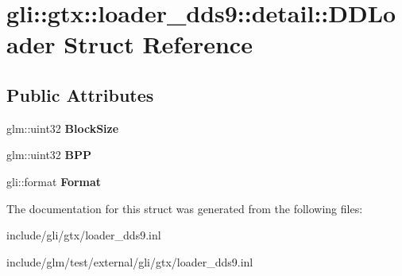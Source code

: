 \hypertarget{structgli_1_1gtx_1_1loader__dds9_1_1detail_1_1DDLoader}{\section{gli\-:\-:gtx\-:\-:loader\-\_\-dds9\-:\-:detail\-:\-:\-D\-D\-Loader \-Struct \-Reference}
\label{structgli_1_1gtx_1_1loader__dds9_1_1detail_1_1DDLoader}
}
\subsection*{\-Public \-Attributes}
\begin{DoxyCompactItemize}
\item 
\hypertarget{structgli_1_1gtx_1_1loader__dds9_1_1detail_1_1DDLoader_afe7cf9f118fc0d8d37415115e177ab4e}{glm\-::uint32 {\bfseries \-Block\-Size}}\label{structgli_1_1gtx_1_1loader__dds9_1_1detail_1_1DDLoader_afe7cf9f118fc0d8d37415115e177ab4e}

\item 
\hypertarget{structgli_1_1gtx_1_1loader__dds9_1_1detail_1_1DDLoader_ad9f8bfde53190273277ecdf1ea8152b8}{glm\-::uint32 {\bfseries \-B\-P\-P}}\label{structgli_1_1gtx_1_1loader__dds9_1_1detail_1_1DDLoader_ad9f8bfde53190273277ecdf1ea8152b8}

\item 
\hypertarget{structgli_1_1gtx_1_1loader__dds9_1_1detail_1_1DDLoader_a7ef0a0467042ee74e6335004a5557d35}{gli\-::format {\bfseries \-Format}}\label{structgli_1_1gtx_1_1loader__dds9_1_1detail_1_1DDLoader_a7ef0a0467042ee74e6335004a5557d35}

\end{DoxyCompactItemize}


\-The documentation for this struct was generated from the following files\-:\begin{DoxyCompactItemize}
\item 
include/gli/gtx/loader\-\_\-dds9.\-inl\item 
include/glm/test/external/gli/gtx/loader\-\_\-dds9.\-inl\end{DoxyCompactItemize}
